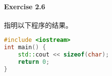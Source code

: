\documentclass{article}
\begin{document}
	\paragraph*{Exercise 2.6} 
	
	指明以下程序的结果。
	
	\begin{lstlisting}[language=C++]  		
#include <iostream>
int main() {
	std::cout << sizeof(char);
	return 0;
}
	\end{lstlisting}
	
\end{document}
